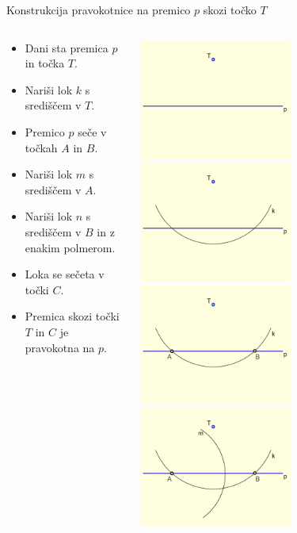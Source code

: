 \begin{frame}{Konstrukcija pravokotnice na premico $p$ skozi točko $T$}
	\begin{columns}
		\begin{column}{0.55\textwidth}
		  \begin{itemize}
			 \item<1-> Dani sta premica $p$ in točka $T$.
			 \item<2-> Nariši lok $k$ s središčem v $T$.
			 \item<3-> Premico $p$ seče v točkah $A$ in $B$.
			 \item<4-> Nariši lok $m$ s središčem v $A$.
			 \item<5-> Nariši lok $n$ s središčem v $B$ in z enakim polmerom.
			 \item<6-> Loka se sečeta v točki $C$.
			 \item<7-> Premica skozi točki $T$ in $C$ je pravokotna na $p$.
		  \end{itemize}
		\end{column}
		\begin{column}{0.45\textwidth}
			\centering
		  	\includegraphics[width=50mm]{slike/fig-1.png}%
			\includegraphics[width=50mm]{slike/fig-2.png}%
			\includegraphics[width=50mm]{slike/fig-3.png}%
			\includegraphics[width=50mm]{slike/fig-4.png}%

\end{column}
\end{columns}
\end{frame}

